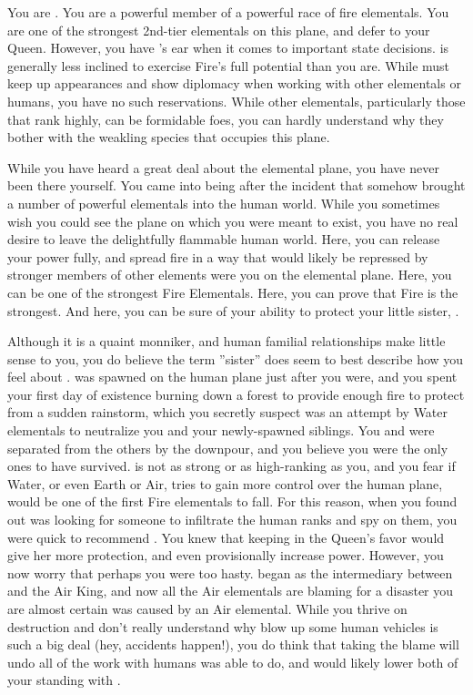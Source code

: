 \documentclass[char]{elementals}
\begin{document}
\name{\cPyro{}}

You are \cPyro{\intro}.  You are a powerful member of a powerful race of fire elementals.  You are one of the strongest 2nd-tier elementals on this plane, and defer to your Queen.  However, you have \cQueen{\intro}'s ear when it comes to important state decisions.  \cQueen{\they} is generally less inclined to exercise Fire's full potential than you are.  While \cQueen{\they} must keep up appearances and show diplomacy when working with other elementals or humans, you have no such reservations.  While other elementals, particularly those that rank highly, can be formidable foes, you can hardly understand why they bother with the weakling species that occupies this plane.

While you have heard a great deal about the elemental plane, you have never been there yourself.  You came into being after the incident that somehow brought a number of powerful elementals into the human world.  While you sometimes wish you could see the plane on which you were meant to exist, you have no real desire to leave the delightfully flammable human world.  Here, you can release your power fully, and spread fire in a way that would likely be repressed by stronger members of other elements were you on the elemental plane.  Here, you can be one of the strongest Fire Elementals.  Here, you can prove that Fire is the strongest.  And here, you can be sure of your ability to protect your little sister, \cJuliet{\intro}.

Although it is a quaint monniker, and human familial relationships make little sense to you, you do believe the term ''sister'' does seem to best describe how you feel about \cJuliet{}.  \cJuliet{\they} was spawned on the human plane just after you were, and you spent your first day of existence burning down a forest to provide enough fire to protect \cJuliet{\them} from a sudden rainstorm, which you secretly suspect was an attempt by Water elementals to neutralize you and your newly-spawned siblings.  You and \cJuliet{} were separated from the others by the downpour, and you believe you were the only ones to have survived. \cJuliet{\they} is not as strong or as high-ranking as you, and you fear if Water, or even Earth or Air, tries to gain more control over the human plane, \cJuliet{\they} would be one of the first Fire elementals to fall. For this reason, when you found out \cQueen{} was looking for someone to infiltrate the human ranks and spy on them, you were quick to recommend \cJuliet{}.  You knew that keeping \cJuliet{\them} in the Queen's favor would give her more protection, and even provisionally increase  power.  However, you now worry that perhaps you were too hasty.  \cJuliet{} began as the intermediary between \cQueen{} and the Air King, and now all the Air elementals are blaming \cJuliet{\them} for a disaster you are almost certain was caused by an Air elemental.  While you thrive on destruction and don't really understand why blow up some human vehicles is such a big deal (hey, accidents happen!), you do think that \cJuliet{} taking the blame will undo all of the work with humans \cJuliet{\they} was able to do, and would likely lower both of your standing with \cQueen{}.
\end{document}
